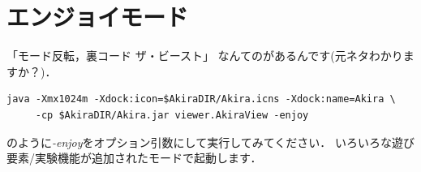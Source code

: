 \documentclass[a4j,openany]{jbook}
\begin{document}
 \section{エンジョイモード}\label{sec:thebeast}
「モード反転，裏コード ザ・ビースト」
なんてのがあるんです(元ネタわかりますか？)．
   \begin{screen}
\begin{verbatim}
java -Xmx1024m -Xdock:icon=$AkiraDIR/Akira.icns -Xdock:name=Akira \
     -cp $AkiraDIR/Akira.jar viewer.AkiraView -enjoy
\end{verbatim}
   \end{screen}
のように{\em -enjoy}をオプション引数にして実行してみてください．
いろいろな遊び要素/実験機能が追加されたモードで起動します．

\end{document}
